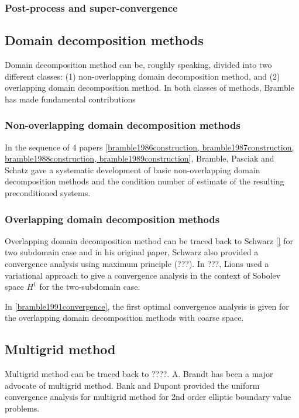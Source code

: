 \documentclass[CJK,11pt]{amsart}
\theoremstyle{definition}
\begin{document}
\begin{CJK*}{UTF8}{gbsn}
\subsubsection{Post-process and super-convergence}


\subsection{Domain decomposition methods}
Domain decomposition method can be, roughly speaking, divided into two different classes: (1) non-overlapping domain decomposition method, and (2) overlapping domain decomposition method.  In both classes of methods, Bramble has made fundamental contributions

\subsubsection{Non-overlapping domain decomposition methods}
In the sequence of 4 papers \eqref{bramble1986construction, bramble1987construction, bramble1988construction, bramble1989construction}, Bramble, Pasciak and Schatz gave a systematic development of basic non-overlapping domain decomposition methods and the condition number of estimate of the resulting preconditioned systems. 

\subsubsection{Overlapping domain decomposition methods}
Overlapping domain decomposition method can be traced back to Schwarz \eqref{} for two subdomain case and in his original paper, Schwarz also provided a convergence analysis using maximum principle (???).  In ???, Lions used a variational approach to give a convergence analysis in the context of Sobolev space $H^1$ for the two-subdomain case.

In \eqref{bramble1991convergence}, the first optimal convergence analysis is given for the overlapping domain decomposition methods with coarse space. 

\subsection{Multigrid method}
Multigrid method can be traced back to ????.  A. Brandt has been a major advocate of multigrid method.  Bank and Dupont provided the uniform convergence analysis for multigrid method for 2nd order elliptic boundary value problems. 


\end{CJK*}
\end{document}
